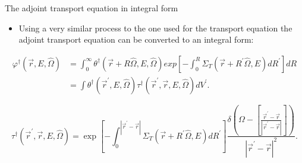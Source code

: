 \documentclass{beamer}
\begin{document}
\begin{frame}{The adjoint transport equation in integral form}

  \begin{itemize}
    \item Using a very similar process to the one used for the transport 
      equation the adjoint transport equation can be converted to an
      integral form:
  \end{itemize}
  \begin{align}
    \varphi^{\dagger}(\vec{r},E,\hat{\Omega}) & = 
    \int_0^{\infty} \theta^{\dagger}(\vec{r} + R\hat{\Omega},E,\hat{\Omega})
    exp\left[-\int_0^R \Sigma_T(\vec{r}+R^{'}\hat{\Omega},E)dR^{'} \right] dR
    \nonumber \\
    & = \int \theta^{\dagger}(\vec{r}^{'},E,\hat{\Omega}) 
    \tau^{\dagger}(\vec{r}^{'},\vec{r},E,\hat{\Omega}) dV^{'}. \nonumber
  \end{align}

  \begin{equation*}
    \tau^{\dagger}(\vec{r}^{'},\vec{r},E,\hat{\Omega}) = 
    \exp{\left[-\int_0^{|\vec{r}^{'} - \vec{r}|} 
        \Sigma_T(\vec{r}+R^{'}\hat{\Omega},E)dR^{'} \right]}
    \frac{\delta \left(\Omega - \left[\frac{\vec{r}^{'} - \vec{r}}
        {|\vec{r}^{'} - \vec{r}|}\right]\right)}
         {|\vec{r}^{'} - \vec{r}|^2}.
  \end{equation*}

\end{frame}
\end{document}
